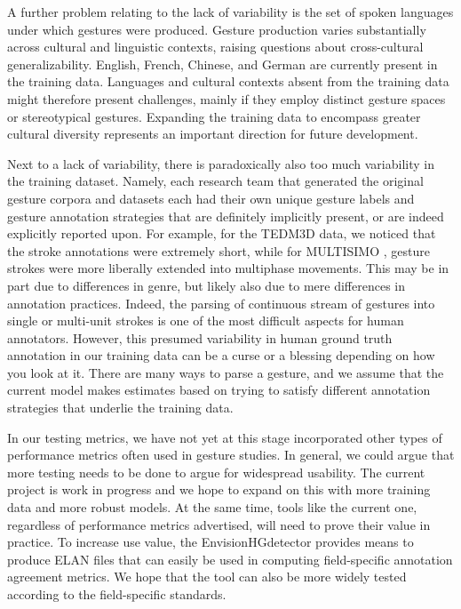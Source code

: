 \documentclass[11pt,smallheadings,cleardoublepage=empty,tocflat,numbers=noenddot,twoside,captions=tableheading]{scrbook}
\begin{document}
\begin{refsection}
A further problem relating to the lack of variability is the set of spoken languages under which gestures were produced. Gesture production varies substantially across cultural and linguistic contexts, raising questions about cross-cultural generalizability. English, French, Chinese, and German are currently present in the training data. Languages and cultural contexts absent from the training data might therefore present challenges, mainly if they employ distinct gesture spaces or stereotypical gestures. Expanding the training data to encompass greater cultural diversity represents an important direction for future development.

Next to a lack of variability, there is paradoxically also too much variability in the training dataset. Namely, each research team that generated the original gesture corpora and datasets each had their own unique gesture labels and gesture annotation strategies that are definitely implicitly present, or are indeed explicitly reported upon. For example, for the TEDM3D \parencite{rohrerTemporalPragmaticAnalysis2022} data, we noticed that the stroke annotations were extremely short, while for MULTISIMO \parencite{koutsombogeraMULTISIMOMultimodalCorpus2017}, gesture strokes were more liberally extended into multiphase movements. This may be in part due to differences in genre, but likely also due to mere differences in annotation practices. Indeed, the parsing of continuous stream of gestures into single or multi-unit strokes is one of the most difficult aspects for human annotators. However, this presumed variability in human ground truth annotation in our training data can be a curse or a blessing depending on how you look at it. There are many ways to parse a gesture, and we assume that the current model makes estimates based on trying to satisfy different annotation strategies that underlie the training data. 

In our testing metrics, we have not yet at this stage incorporated other types of performance metrics often used in gesture studies. In general, we could argue that more testing needs to be done to argue for widespread usability. The current project is work in progress and we hope to expand on this with more training data and more robust models. At the same time, tools like the current one, regardless of performance metrics advertised, will need to prove their value in practice. To increase use value, the EnvisionHGdetector provides means to produce ELAN files that can easily be used in computing field-specific annotation agreement metrics. We hope that the tool can also be more widely tested according to the field-specific standards.


\end{refsection}
\end{document}
